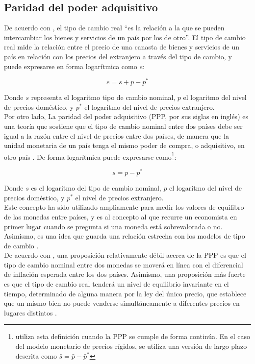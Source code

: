 	
	\subsection{Paridad del poder adquisitivo}
	De acuerdo con \textcite[311]{mochon}, el tipo de cambio real ``es la relación a la que se pueden intercambiar los bienes y servicios de un país por los de otro''. El tipo de cambio real mide la relación entre el precio de una canasta de bienes y servicios de un país en relación con los precios del extranjero a través del tipo de cambio, y puede expresarse en forma logarítmica como $e$:
	
	\begin{equation}
		e = s + p - p^*
	\end{equation}
	
	Donde $s$ representa el logaritmo tipo de cambio nominal, $p$ el logaritmo del nivel de precios doméstico, y $p^*$ el logaritmo del nivel de precios extranjero.\\
	
	Por otro lado, La paridad del poder adquisitivo (PPP, por sus siglas en inglés) es una teoría que sostiene que el tipo de cambio nominal entre dos países debe ser igual a la razón entre el nivel de precios entre dos países, de manera que la unidad monetaria de un país tenga el mismo poder de compra, o adquisitivo, en otro país \parencite{banguatppp}. De forma logarítmica puede expresarse como\footnote{\textcite{frankel1993exchange} utiliza esta definición cuando la PPP se cumple de forma continúa. En el caso del modelo monetario de precios rígidos, se utiliza una versión de largo plazo descrita como $\bar{s} = \bar{p} - \bar{p}^* $ }: 
	
	\begin{equation}
		s = p - p^* 
		\label{ppp}
	\end{equation}
	
	Donde $s$ es el logaritmo del tipo de cambio nominal, $p$ el logaritmo del nivel de precios doméstico, y $p^*$ el nivel de precios extranjero.\\
	
	Este concepto ha sido utilizado ampliamente para medir los valores de equilibro de las monedas entre países, y es al concepto al que recurre un economista en primer lugar cuando se pregunta si una moneda está sobrevalorada o no. Asimismo, es una idea que guarda una relación estrecha con los modelos de tipo de cambio \parencite{exchecon}.\\
	
	De acuerdo con \textcite{boughton1988monetary}, una proposición relativamente débil acerca de la PPP es que el tipo de cambio nominal entre dos monedas se moverá en línea con el diferencial de inflación esperada entre los dos países. Asimismo, una proposición más fuerte es que el tipo de cambio real tenderá un nivel de equilibrio invariante en el tiempo, determinado de alguna manera por la ley del único precio, que establece que un mismo bien no puede venderse simultáneamente a diferentes precios en lugares distintos \parencite{mochon}.
	
